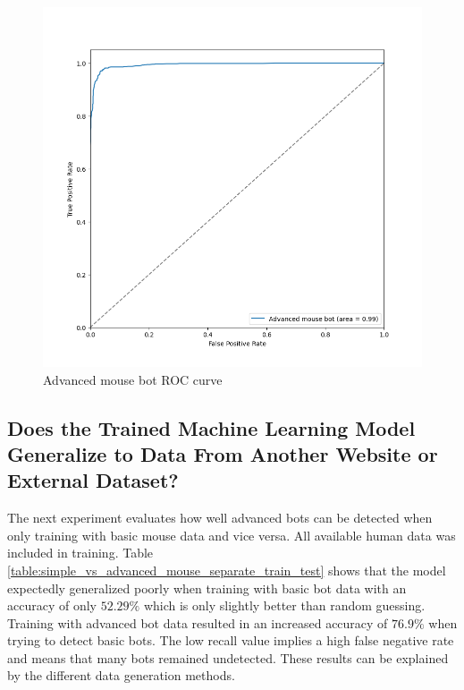 \documentclass[
    fontsize=12pt,
    headings=small,
    parskip=half,           %
    bibliography=totoc,
    numbers=noenddot,       %
    open=any,               %
    final,                   %
    table
]{scrreprt}
\begin{document}
\begin{figure}[H]
    \includegraphics[width=\textwidth]{figures/mouse_advanced_roc.png}
    \caption{Advanced mouse bot ROC curve}
    \label{fig:mouse_advanced_roc}
\end{figure}

\subsection{Does the Trained Machine Learning Model Generalize to Data From Another Website or External Dataset?}

The next experiment evaluates how well advanced bots can be detected when only training with basic mouse data and vice versa. All available human data was included in training. Table \ref{table:simple_vs_advanced_mouse_separate_train_test} shows that the model expectedly generalized poorly when training with basic bot data with an accuracy of only $52.29\%$ which is only slightly better than random guessing. Training with advanced bot data resulted in an increased accuracy of $76.9\%$ when trying to detect basic bots. The low recall value implies a high false negative rate and means that many bots remained undetected. These results can be explained by the different data generation methods.
\end{document}
